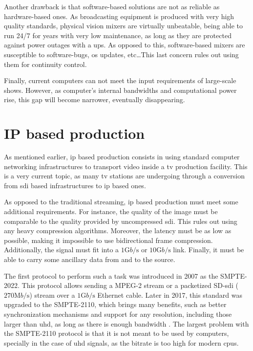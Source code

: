 \documentclass[../main.tex]{subfiles}
\begin{document}
Another drawback is that software-based solutions are not as reliable as hardware-based ones. As broadcasting equipment is produced with very high quality standards, physical vision mixers are virtually unbeatable, being able to run 24/7 for years with very low maintenance, as long as they are protected against power outages with a \gls{ups}. As opposed to this, software-based mixers are susceptible to software-bugs, \gls{os} updates, etc\dots This last concern rules out using them for continuity control.\newline

Finally, current computers can not meet the input requirements of large-scale shows. However, as computer's internal bandwidths and computational power rise, this gap will become narrower, eventually disappearing.\newline

\section{IP based production}
As mentioned earlier, \gls{ip} based production consists in using standard computer networking infrastructures to transport video inside a \gls{tv} production facility. This is a very current topic, as many \gls{tv} stations are undergoing through a conversion from \gls{sdi} based infrastructures to \gls{ip} based ones\cite{tmRtveIp}.\newline

As opposed to the traditional streaming, \gls{ip} based production must meet some additional requirements. For instance, the quality of the image must be comparable to the quality provided by uncompressed \gls{sdi}. This rules out using any heavy compression algorithms. Moreover, the latency must be as low as possible, making it impossible to use bidirectional frame compression. Additionally, the signal must fit into a $1 \si{\giga b \per\second}$ or $10 \si{\giga b \per\second}$ link. Finally, it must be able to carry some ancillary data from and to the source.\newline

The first protocol to perform such a task was introduced in 2007 as the SMPTE-2022. This protocol allows sending a MPEG-2 stream or a packetized SD-\gls{sdi} ($270 \si{\mega b \per\second}$) stream over a $1 \si{\giga b \per \second}$ Ethernet cable\cite{tmIpProduction}. Later in 2017, this standard was upgraded to the SMPTE-2110, which brings many benefits, such as better synchronization mechanisms and support for any resolution, including those larger than \gls{uhd}, as long as there is enough bandwidth \cite{smpte2110faq}. The largest problem with the SMPTE-2110 protocol is that it is not meant to be used by computers, specially in the case of \gls{uhd} signals, as the bitrate is too high for modern \glspl{cpu}.\newline
\end{document}
